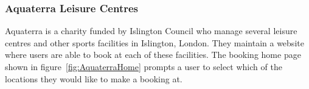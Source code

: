 \subsubsection{Aquaterra Leisure Centres}
\label{ssub:aquaterra_leisure_centres}

Aquaterra is a charity funded by Islington Council who manage several leisure
centres and other sports facilities in Islington, London. They maintain a
website\cite{AquaterraLeisure} where users are able to book at each of these
facilities. The booking home page shown in figure~\ref{fig:AquaterraHome}
prompts a user to select which of the locations they would like to make a
booking at.

